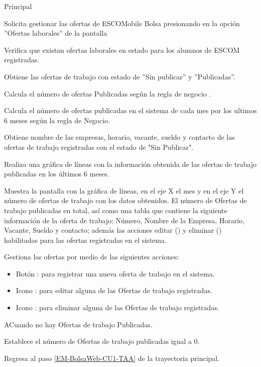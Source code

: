 \begin{UCtrayectoria}{Principal}

	\UCpaso [\UCactor] Solicita gestionar las ofertas de ESCOMobile Bolsa presionando en la opción ''Ofertas laborales'' de la pantalla 

	\UCpaso Verifica que existan ofertas laborales en estado para los alumnos de ESCOM registradas.  

	\UCpaso Obtiene las ofertas de trabajo con estado de ''Sin publicar'' y ''Publicadas''.

	\UCpaso Calcula el número de ofertas Publicadas según la regla de negocio .

	\UCpaso Calcula el número de ofertas publicadas en el sistema de cada mes por los ultimos 6 meses según la regla de Negocio.

	\UCpaso Obtiene nombre de las empresas, horario, vacante, sueldo y contacto de las ofertas de trabajo registradas con el estado de "Sin Publicar".
	
	\UCpaso Realiza una gráfica de líneas con la información obtenida de las ofertas de trabajo publicadas en los últimos 6 meses.
	
	\UCpaso Muestra la pantalla  con la gráfica de líneas, en el eje X el mes y en el eje Y el número de ofertas de trabajo con los datos obtenidos. El número de Ofertas de trabajo publicadas en total, así como una tabla que contiene la siguiente información de la oferta de trabajo: Número, Nombre de la Empresa, Horario, Vacante, Sueldo y contacto; además las acciones editar () y eliminar () habilitadas para las ofertas registradas en el sistema. \label{EM-BolsaWeb-CU1-TAA}

	\UCpaso [\UCactor] Gestiona las ofertas por medio de las siguientes acciones: 
	\begin{itemize}
		\item Botón : para registrar una nueva oferta de trabajo en el sistema.
		\item Icono : para editar alguna de las Ofertas de trabajo registradas.
		\item Icono : para eliminar alguna de las Ofertas de trabajo registradas.
	\end{itemize}

\end{UCtrayectoria}

\begin{UCtrayectoriaA}{A}{Cuando no hay Ofertas de trabajo Publicadas.}
	
	\UCpaso Establece el número de Ofertas de trabajo publicadas igual a 0. 

	\UCpaso Regresa al paso \ref{EM-BolsaWeb-CU1-TAA} de la trayectoria principal.
\end{UCtrayectoriaA}

